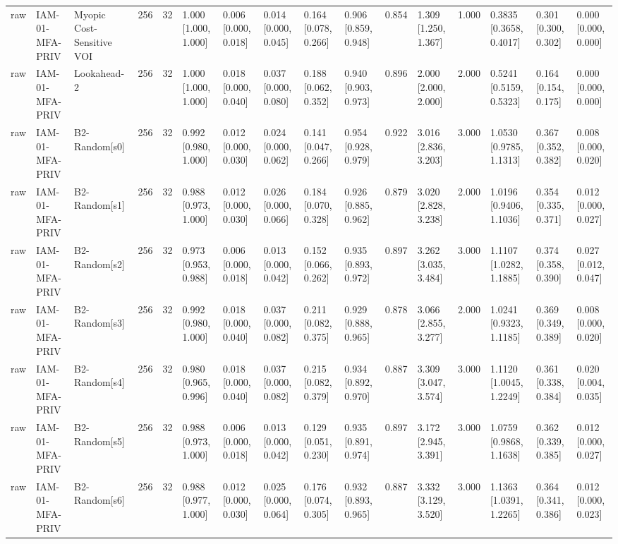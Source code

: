 \begin{table}[!ht]
{\begin{tabular}{llllllllllllllll}
raw & IAM-01-MFA-PRIV & Myopic Cost-Sensitive VOI & 256 & 32 & 1.000 [1.000, 1.000] & 0.006 [0.000, 0.018] & 0.014 [0.000, 0.045] & 0.164 [0.078, 0.266] & 0.906 [0.859, 0.948] & 0.854 & 1.309 [1.250, 1.367] & 1.000 & 0.3835 [0.3658, 0.4017] & 0.301 [0.300, 0.302] & 0.000 [0.000, 0.000] \\
raw & IAM-01-MFA-PRIV & Lookahead-2 & 256 & 32 & 1.000 [1.000, 1.000] & 0.018 [0.000, 0.040] & 0.037 [0.000, 0.080] & 0.188 [0.062, 0.352] & 0.940 [0.903, 0.973] & 0.896 & 2.000 [2.000, 2.000] & 2.000 & 0.5241 [0.5159, 0.5323] & 0.164 [0.154, 0.175] & 0.000 [0.000, 0.000] \\
raw & IAM-01-MFA-PRIV & B2-Random[s0] & 256 & 32 & 0.992 [0.980, 1.000] & 0.012 [0.000, 0.030] & 0.024 [0.000, 0.062] & 0.141 [0.047, 0.266] & 0.954 [0.928, 0.979] & 0.922 & 3.016 [2.836, 3.203] & 3.000 & 1.0530 [0.9785, 1.1313] & 0.367 [0.352, 0.382] & 0.008 [0.000, 0.020] \\
raw & IAM-01-MFA-PRIV & B2-Random[s1] & 256 & 32 & 0.988 [0.973, 1.000] & 0.012 [0.000, 0.030] & 0.026 [0.000, 0.066] & 0.184 [0.070, 0.328] & 0.926 [0.885, 0.962] & 0.879 & 3.020 [2.828, 3.238] & 2.000 & 1.0196 [0.9406, 1.1036] & 0.354 [0.335, 0.371] & 0.012 [0.000, 0.027] \\
raw & IAM-01-MFA-PRIV & B2-Random[s2] & 256 & 32 & 0.973 [0.953, 0.988] & 0.006 [0.000, 0.018] & 0.013 [0.000, 0.042] & 0.152 [0.066, 0.262] & 0.935 [0.893, 0.972] & 0.897 & 3.262 [3.035, 3.484] & 3.000 & 1.1107 [1.0282, 1.1885] & 0.374 [0.358, 0.390] & 0.027 [0.012, 0.047] \\
raw & IAM-01-MFA-PRIV & B2-Random[s3] & 256 & 32 & 0.992 [0.980, 1.000] & 0.018 [0.000, 0.040] & 0.037 [0.000, 0.082] & 0.211 [0.082, 0.375] & 0.929 [0.888, 0.965] & 0.878 & 3.066 [2.855, 3.277] & 2.000 & 1.0241 [0.9323, 1.1185] & 0.369 [0.349, 0.389] & 0.008 [0.000, 0.020] \\
raw & IAM-01-MFA-PRIV & B2-Random[s4] & 256 & 32 & 0.980 [0.965, 0.996] & 0.018 [0.000, 0.040] & 0.037 [0.000, 0.082] & 0.215 [0.082, 0.379] & 0.934 [0.892, 0.970] & 0.887 & 3.309 [3.047, 3.574] & 3.000 & 1.1120 [1.0045, 1.2249] & 0.361 [0.338, 0.384] & 0.020 [0.004, 0.035] \\
raw & IAM-01-MFA-PRIV & B2-Random[s5] & 256 & 32 & 0.988 [0.973, 1.000] & 0.006 [0.000, 0.018] & 0.013 [0.000, 0.042] & 0.129 [0.051, 0.230] & 0.935 [0.891, 0.974] & 0.897 & 3.172 [2.945, 3.391] & 3.000 & 1.0759 [0.9868, 1.1638] & 0.362 [0.339, 0.385] & 0.012 [0.000, 0.027] \\
raw & IAM-01-MFA-PRIV & B2-Random[s6] & 256 & 32 & 0.988 [0.977, 1.000] & 0.012 [0.000, 0.030] & 0.025 [0.000, 0.064] & 0.176 [0.074, 0.305] & 0.932 [0.893, 0.965] & 0.887 & 3.332 [3.129, 3.520] & 3.000 & 1.1363 [1.0391, 1.2265] & 0.364 [0.341, 0.386] & 0.012 [0.000, 0.023] \\

\end{tabular}}
\end{table}
